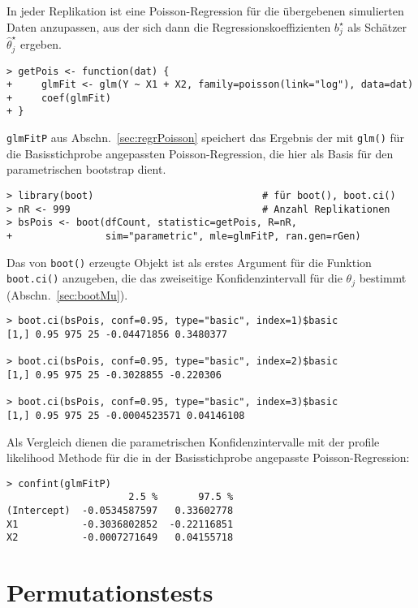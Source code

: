 In jeder Replikation ist eine Poisson-Regression für die übergebenen simulierten Daten anzupassen, aus der sich dann die Regressionskoeffizienten $b_{j}^{\star}$ als Schätzer $\hat{\theta}_{j}^{\star}$ ergeben.
\begin{lstlisting}
> getPois <- function(dat) {
+     glmFit <- glm(Y ~ X1 + X2, family=poisson(link="log"), data=dat)
+     coef(glmFit)
+ }
\end{lstlisting}

\lstinline!glmFitP! aus Abschn.\ \ref{sec:regrPoisson} speichert das Ergebnis der mit \lstinline!glm()! für die Basisstichprobe angepassten Poisson-Regression, die hier als Basis für den parametrischen bootstrap dient.
\begin{lstlisting}
> library(boot)                             # für boot(), boot.ci()
> nR <- 999                                 # Anzahl Replikationen
> bsPois <- boot(dfCount, statistic=getPois, R=nR,
+                sim="parametric", mle=glmFitP, ran.gen=rGen)
\end{lstlisting}

Das von \lstinline!boot()! erzeugte Objekt ist als erstes Argument für die Funktion \lstinline!boot.ci()! anzugeben, die das zweiseitige Konfidenzintervall für die $\theta_{j}$ bestimmt (Abschn.\ \ref{sec:bootMu}).
\begin{lstlisting}
> boot.ci(bsPois, conf=0.95, type="basic", index=1)$basic
[1,] 0.95 975 25 -0.04471856 0.3480377

> boot.ci(bsPois, conf=0.95, type="basic", index=2)$basic
[1,] 0.95 975 25 -0.3028855 -0.220306

> boot.ci(bsPois, conf=0.95, type="basic", index=3)$basic
[1,] 0.95 975 25 -0.0004523571 0.04146108
\end{lstlisting}

Als Vergleich dienen die parametrischen Konfidenzintervalle mit der profile likelihood Methode für die in der Basisstichprobe angepasste Poisson-Regression:
\begin{lstlisting}
> confint(glmFitP)
                     2.5 %       97.5 %
(Intercept)  -0.0534587597   0.33602778
X1           -0.3036802852  -0.22116851
X2           -0.0007271649   0.04155718
\end{lstlisting}

\section{Permutationstests}
\label{sec:permTests}

